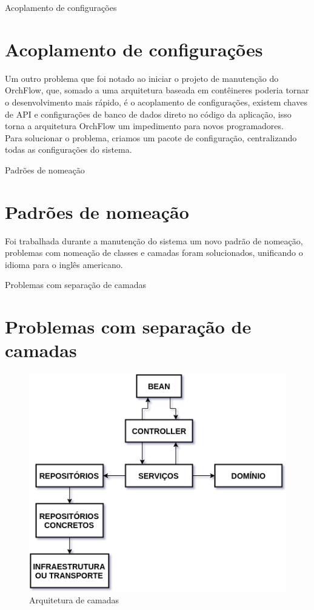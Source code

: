 \documentclass[aspectratio=43]{beamer}
\begin{document}
\begin{frame}{Acoplamento de configurações}
\section{Acoplamento de configurações}
Um outro problema que foi notado ao iniciar o projeto de manutenção do OrchFlow, que, somado a uma arquitetura baseada em contêineres poderia tornar o desenvolvimento mais rápido, é o acoplamento de configurações, existem chaves de API e configurações de banco de dados direto no código da aplicação, isso torna a arquitetura OrchFlow um impedimento para novos programadores.\\
Para solucionar o problema, criamos um pacote de configuração, centralizando todas as configurações do sistema.
\end{frame}

\begin{frame}{Padrões de nomeação}
\section{Padrões de nomeação}
Foi trabalhada durante a manutenção do sistema um novo padrão de nomeação, problemas com nomeação de classes e camadas foram solucionados, unificando o idioma para o inglês americano.
\end{frame}

\begin{frame}{Problemas com separação de camadas}
\section{Problemas com separação de camadas}
\begin{figure}[H]
    \label{figure_arquitetura_camadas}
    \centering
    \caption{Arquitetura de camadas}
    \includegraphics[scale=0.4]{arquitetura_camadas.png}
    \hfill
\end{figure}
\end{frame}
\end{document}
